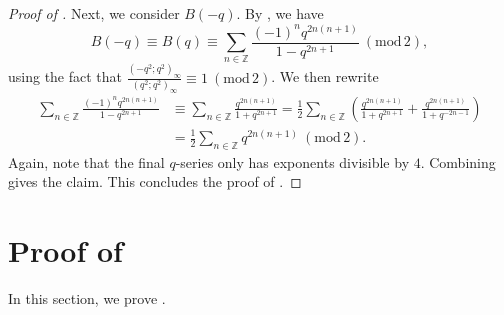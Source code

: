 \documentclass[12pt,reqno]{amsart}
\renewcommand{\(}{\left\(}
\renewcommand{\)}{\right\)}
\numberwithin{equation}{section}
\theoremstyle{plain}
\theoremstyle{definition}
\numberwithin{equation}{section}
\renewcommand{\pmod}[1]{\ \left( \mathrm{mod} \, #1 \right)}
\begin{document}
\begin{proof}[Proof of ]
 
 Next, we consider $B(-q)$. By , we have 
 \begin{equation*}%
 B(-q)\equiv B(q)\equiv\sum_{n\in \mathbb{Z}}\frac{(-1)^n q^{2n(n+1)}}{1-q^{2n+1}}\pmod{2},
 \end{equation*}
using the fact that $\frac{(-q^2;q^2)_{\infty}}{(q^2;q^2)_{\infty}}\equiv 1\pmod{2}$. We then rewrite 
\begin{align*}%
\sum_{n\in \mathbb{Z}}\frac{(-1)^n q^{2n(n+1)}}{1-q^{2n+1}}&\equiv \sum_{n\in \mathbb{Z}}\frac{ q^{2n(n+1)}}{1+q^{2n+1}}=\frac 12\sum_{n\in \mathbb{Z}}\left(\frac{q^{2n(n+1)}}{1+q^{2n+1}}+\frac{q^{2n(n+1)}}{1+q^{-2n-1}}\right)\nonumber\\
&=\frac 12\sum_{n\in \mathbb{Z}}q^{2n(n+1)}\pmod{2}.
\end{align*}
Again, note that the final $q$-series only has exponents divisible by $4$. Combining gives the claim. %
This concludes the proof of .\qedhere 
\end{proof}


\section{Proof of }\label{sec3a}

In this section, we prove . 
\end{document}
